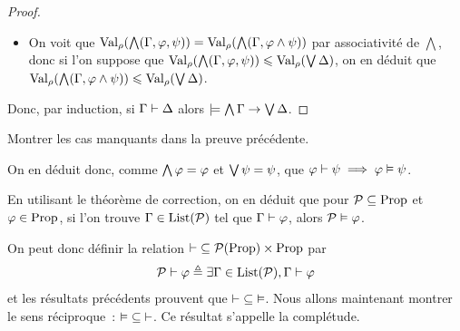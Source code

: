 \begin{proof}
\begin{itemize}
    \begin{itemize}
    \item si $\ValE(\varFF) = 1$, alors en injectant cette égalité dans
      \ref{eq.cor4}, on obtient
      \[\min_{\varFC \in \varCG} \ValE(\varFC) \leq
      \max_{\varFC \in \varCD} \ValE(\varFC)\]
      d'où l'inégalité souhaitée en ajoutant un terme dans le minimum.
    \item si $\ValE(\varFF) = 0$, alors on procède par disjonction de cas
      sur la valeur de $\ValE(\varFP)$~:
      \begin{itemize}
      \item si $\ValE(\varFP) = 1$, l'argument précédent fonctionne aussi en
        remplaçant \ref{eq.cor4} par \ref{eq.cor5}.
      \item si $\ValE(\varFP) = 0$, alors on sait que
        $\ValE(\varFF\lor \varFP) = 0$
        avec nos deux équations, donc
        $\min_{\varFC \in (\varCG, \varFF \lor \varFP)} \ValE(\varFC) = 0$,
        d'où l'inégalité.
      \end{itemize}
    \end{itemize}
  \item[$\Rland$~:] On voit que
    $\operatorname{Val}_{\rho}(\bigwedge(\Gamma,\varphi,\psi)) =
    \operatorname{Val}_{\rho}(\bigwedge(\Gamma, \varphi \land \psi))$
    par associativité de $\bigwedge$, donc si l'on suppose que
    $\operatorname{Val}_{\rho}(\bigwedge(\Gamma,\varphi,\psi)) \leqslant \operatorname{Val}_{\rho}(\bigvee\Delta)$,
    on en déduit que
    $\operatorname{Val}_{\rho}(\bigwedge(\Gamma,\varphi\land\psi))\leqslant\operatorname{Val}_{\rho}(\bigvee\Delta)$.
  \end{itemize}
  Donc, par induction, si $\Gamma\vdash \Delta$ alors
  $\models \bigwedge\Gamma\to\bigvee\Delta$.
\end{proof}

\begin{exercise}
  Montrer les cas manquants dans la preuve précédente.
\end{exercise}

\noindent
On en déduit donc, comme $\bigwedge \varphi = \varphi$ et
$\bigvee \psi = \psi$, que $\varphi\vdash \psi \implies \varphi \vDash \psi$.

\begin{remark}
  En utilisant le théorème de correction, on en déduit que pour
  $\mathcal P\subseteq \operatorname{Prop}$ et $\varphi\in \operatorname{Prop}$, si l'on trouve
  $\Gamma\in\operatorname{List}(\mathcal P)$ tel que $\Gamma\vdash \varphi$, alors
  $\mathcal P \vDash \varphi$.

  On peut donc définir la relation
  $\mathord{\vdash} \subseteq \mathcal{P}(\operatorname{Prop})\times \operatorname{Prop}$ par
  \[\mathcal P\vdash \varphi \triangleq \exists \Gamma\in\operatorname{List}(\mathcal P),
  \Gamma\vdash \varphi\]
  et les résultats précédents prouvent que
  $\mathord{\vdash}\subseteq\mathord{\vDash}$. Nous allons
  maintenant montrer le sens réciproque~:
  $\mathord{\vDash}\subseteq\mathord{\vdash}$. Ce résultat s'appelle la complétude.
\end{remark}

